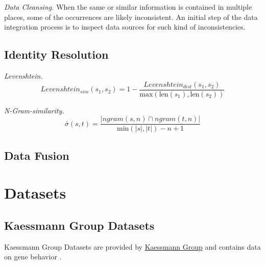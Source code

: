 \textit{Data Cleansing.} When the same or similar information is contained in multiple places, some of the occurrences are likely inconsistent. An initial step of the data integration process is to inspect data sources for such kind of inconsistencies.

\subsection{Identity Resolution}

\textit{Levenshtein.}
\begin{equation*}
Levenshtein_{sim}(s_1, s_2) = 1 - \frac{Levenshtein_{dist}(s_1, s_2)}{\mbox{max}(\mbox{len}(s_1), \mbox{len}(s_2))}
\end{equation*}

\textit{N-Gram-similarity.}
\begin{equation*}
    \bar{\sigma}(s, t) = \frac{|ngram(s, n) \cap ngram(t, n)|}{\mbox{min}(|s|, |t|) - n + 1}
\end{equation*}

\subsection{Data Fusion}

\section{Datasets}

\subsection{Kaessmann Group Datasets}
\label{kaessmannds}
Kaessmann Group Datasets are provided by \href{https://www.zmbh.uni-heidelberg.de/kaessmann/}{Kaessmann Group} and contains data on gene behavior \cite{CardosoMoreira2019GeneEA}.

